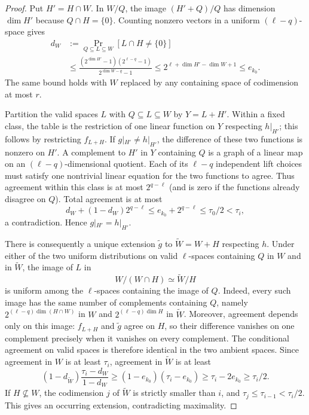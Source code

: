 \begin{proof}
Put $H'=H\cap W$.  In $W/Q$, the image $(H'+Q)/Q$ has dimension
$\dim H'$ because $Q\cap H=\{0\}$.  Counting nonzero vectors in a
uniform $(\ell-q)$-space gives
\begin{align*}
 d_W&:=\Pr_{Q\subseteq L\subseteq W}[L\cap H\ne\{0\}]\\
 &\le
 \frac{(2^{\dim H'}-1)(2^{\ell-q}-1)}{2^{\dim W-q}-1}
 \le 2^{\ell+\dim H'-\dim W+1}
 \le e_{k_0}.
\end{align*}
The same bound holds with $W$ replaced by any containing space of
codimension at most $r$.

Partition the valid spaces $L$ with $Q\subseteq L\subseteq W$ by
$Y=L+H'$.  Within a fixed class, the table is the restriction of one
linear function on $Y$ respecting $h|_{H'}$; this follows by restricting
$f_{L+H}$.  If $g|_{H'}\ne h|_{H'}$, the difference of these two
functions is nonzero on $H'$.  A complement to $H'$ in $Y$ containing
$Q$ is a graph of a linear map on an $(\ell-q)$-dimensional quotient.
Each of its $\ell-q$ independent lift choices must satisfy one
nontrivial linear equation for the two functions to agree.
Thus agreement within this class is at most $2^{q-\ell}$ (and is zero
if the functions already disagree on $Q$).  Total agreement is at most
\[
  d_W+(1-d_W)2^{q-\ell}
  \le e_{k_0}+2^{q-\ell}\le\tau_0/2<\tau_i,
\]
a contradiction.  Hence $g|_{H'}=h|_{H'}$.

There is consequently a unique extension $\widetilde g$ to
$\widetilde W=W+H$ respecting $h$.  Under either of the two uniform
distributions on valid $\ell$-spaces containing $Q$ in $W$ and in
$\widetilde W$, the image of $L$ in
\[
  W/(W\cap H)\simeq\widetilde W/H
\]
is uniform among the $\ell$-spaces containing the image of $Q$.
Indeed, every such image has the same number of complements containing
$Q$, namely $2^{(\ell-q)\dim(H\cap W)}$ in $W$ and
$2^{(\ell-q)\dim H}$ in $\widetilde W$.
Moreover, agreement depends only on this image: $f_{L+H}$ and
$\widetilde g$ agree on $H$, so their difference vanishes on one
complement precisely when it vanishes on every complement.
The conditional agreement on valid spaces is therefore identical in
the two ambient spaces.  Since agreement in $W$ is at least $\tau_i$,
agreement in $\widetilde W$ is at least
\[
  (1-d_{\widetilde W})\frac{\tau_i-d_W}{1-d_W}
  \ge(1-e_{k_0})(\tau_i-e_{k_0})
  \ge\tau_i-2e_{k_0}\ge\tau_i/2.
\]
If $H\not\subseteq W$, the codimension $j$ of $\widetilde W$ is
strictly smaller than $i$, and $\tau_j\le\tau_{i-1}<\tau_i/2$.
This gives an occurring extension, contradicting maximality.
\end{proof}


